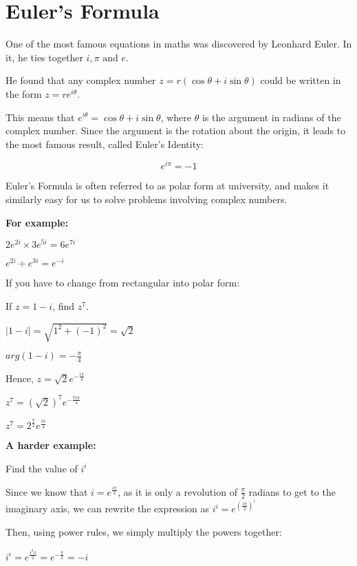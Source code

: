 \documentclass[../main.tex]{subfiles}
\begin{document}
\section{Euler's Formula}
One of the most famous equations in maths was discovered by Leonhard Euler. In it, he ties together \(i,\pi \text{ and } e\).

He found that any complex number \(z=r(\cos{\theta}+i\sin{\theta})\) could be written in the form \(z=re^{i\theta}\).

This means that \(e^{i\theta}=\cos{\theta}+i\sin{\theta}\), where \(\theta\) is the argument in radians of the complex number. Since the argument is the rotation about the origin, it leads to the most famous result, called Euler's Identity:

\[e^{i\pi}=-1\]

Euler's Formula is often referred to as polar form at university, and makes it similarly easy for us to solve problems involving complex numbers.

\textbf{For example:}

\(2e^{2i} \times 3e^{5i}=6e^{7i}\)

\(e^{2i} \div e^{3i}=e^{-i}\)

If you have to change from rectangular into polar form:

If \(z=1-i\), find \(z^7\).

\(|1-i|=\sqrt{1^2+(-1)^2}=\sqrt{2}\)

\(arg(1-i)=-\frac{\pi}{4}\)

Hence, \(z=\sqrt{2}e^{-\frac{i\pi }{4}}\)

\(z^7=(\sqrt{2})^7 e^{-\frac{7i\pi}{4}}\)

\(z^7=2^{\frac{7}{2}}e^{\frac{i\pi}{4}}\)

\textbf{A harder example:}

Find the value of \(i^i\)

Since we know that \(i=e^{\frac{i\pi}{2}}\), as it is only a revolution of \(\frac{\pi}{2}\) radians to get to the imaginary axis, we can rewrite the expression as \(i^i=e^{(\frac{i\pi}{2})^{i}}\)

Then, using power rules, we simply multiply the powers together:

\(i^i=e^{\frac{i^2\pi}{2}}=e^{-\frac{\pi}{2}}=-i\)


\pagebreak
\end{document}
